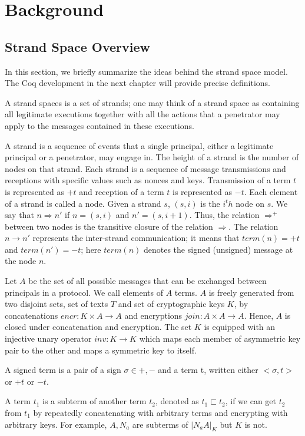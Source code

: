 \chapter{Background}

\section{Strand Space Overview}
In this section, we briefly summarize the ideas behind the strand space model. The Coq development in the next chapter will provide precise definitions.

A strand spaces is a set of strands; one may think of a strand space as containing all legitimate executions together with all the actions that a penetrator may apply to the messages contained in these executions.

A strand is a sequence of events that a single principal, either a legitimate principal or a penetrator, may engage in. The height of a strand is the number of nodes on that strand. Each strand is a sequence of message transmissions and receptions with specific values such as nonces and keys. Transmission of a term $t$ is represented as $+t$ and reception of a term $t$ is represented as $-t$. Each element of a strand is called a node. Given a strand $s$, $(s,i)$ is the $i^th$ node on $s$. We say that $n \Rightarrow n'$ if $n=(s,i)$ and $n'=(s,i+1)$. Thus, the relation $\Rightarrow^+$ between two nodes is the transitive closure of the relation $\Rightarrow$. The relation $n \rightarrow n'$ represents the inter-strand communication; it means that $term(n)=+t$ and $term(n')=-t$; here $term(n)$ denotes the signed (unsigned) message at the node $n$.

Let $A$ be the set of all possible messages that can be exchanged between principals in a protocol. We call elements of $A$ terms. $A$ is freely generated from two disjoint sets, set of texts $T$ and set of cryptographic keys $K$, by concatenations $encr : K \times A \rightarrow A$ and encryptions $join : A \times A \rightarrow A$. Hence, $A$ is closed under concatenation and encryption. The set $K$ is equipped with an injective unary operator $inv : K \rightarrow K$ which maps each member of asymmetric key pair to the other and maps a symmetric key to itself.

A signed term is a pair of a sign $\sigma \in {+,-}$ and a term t, written either $<\sigma,t>$ or $+t$ or $-t$.

A term $t_1$ is a subterm of another term $t_2$, denoted as $t_1 \sqsubset t_2$, if we can get $t_2$ from $t_1$ by repeatedly concatenating with arbitrary terms and encrypting with arbitrary keys. For example, $A, N_a$ are subterms of ${|N_aA|}_K$ but $K$ is not.


